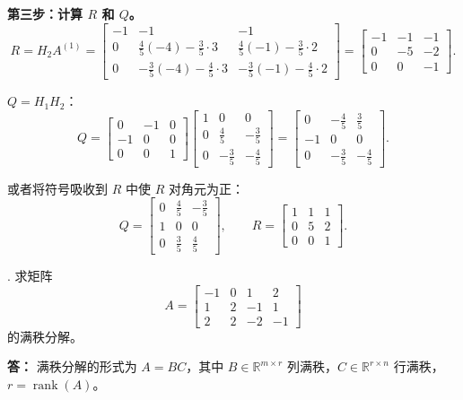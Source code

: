 \documentclass{article}
\begin{document}
\textbf{第三步：计算 $R$ 和 $Q$。}
\[
R = H_2 A^{(1)} = \begin{bmatrix}
-1 & -1 & -1\\
0 & \frac45(-4)-\frac35\cdot3 & \frac45(-1)-\frac35\cdot2\\[4pt]
0 & -\frac35(-4)-\frac45\cdot3 & -\frac35(-1)-\frac45\cdot2
\end{bmatrix}
= \begin{bmatrix}
-1 & -1 & -1\\
0 & -5 & -2\\
0 & 0 & -1
\end{bmatrix}.
\]

$Q = H_1H_2$：
\[
Q = \begin{bmatrix}
0 & -1 & 0\\
-1 & 0 & 0\\
0 & 0 & 1
\end{bmatrix}
\begin{bmatrix}
1 & 0 & 0\\
0 & \frac45 & -\frac35\\[4pt]
0 & -\frac35 & -\frac45
\end{bmatrix}
= \begin{bmatrix}
0 & -\frac45 & \frac35\\[4pt]
-1 & 0 & 0\\[4pt]
0 & -\frac35 & -\frac45
\end{bmatrix}.
\]

或者将符号吸收到 $R$ 中使 $R$ 对角元为正：
\[
Q = \begin{bmatrix}
0 & \frac45 & -\frac35\\[4pt]
1 & 0 & 0\\[4pt]
0 & \frac35 & \frac45
\end{bmatrix},\qquad
R = \begin{bmatrix}
1 & 1 & 1\\
0 & 5 & 2\\
0 & 0 & 1
\end{bmatrix}.
\]
\newpage

. 求矩阵
\[
A=\begin{bmatrix}
-1 & 0 & 1 & 2 \\
1 & 2 & -1 & 1 \\
2 & 2 & -2 & -1
\end{bmatrix}
\]
的满秩分解。

\noindent \textbf{答：}
满秩分解的形式为 $A = BC$，其中 $B\in\mathbb{R}^{m\times r}$ 列满秩，$C\in\mathbb{R}^{r\times n}$ 行满秩，$r=\operatorname{rank}(A)$。
\end{document}
